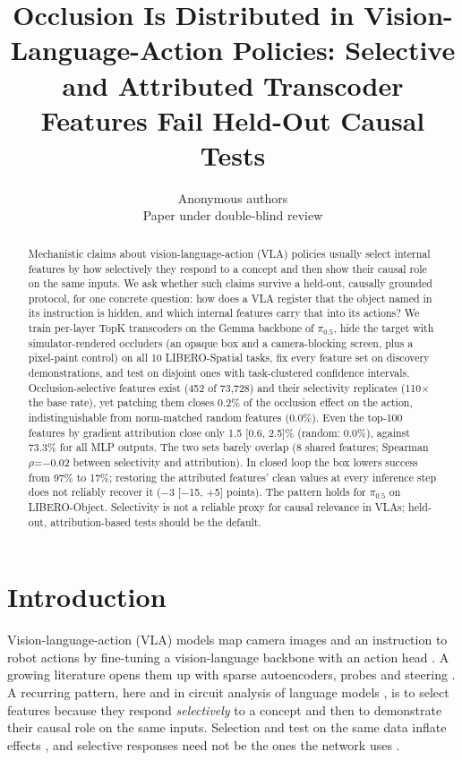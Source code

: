 \documentclass{article}
\title{Occlusion Is Distributed in Vision-Language-Action Policies: Selective and Attributed Transcoder Features Fail Held-Out Causal Tests}
\author{Anonymous authors\\Paper under double-blind review}
\begin{document}
\maketitle

\begin{abstract}
Mechanistic claims about vision-language-action (VLA) policies usually select internal features by how selectively they respond to a concept and then show their causal role on the same inputs. We ask whether such claims survive a held-out, causally grounded protocol, for one concrete question: how does a VLA register that the object named in its instruction is hidden, and which internal features carry that into its actions? We train per-layer TopK transcoders on the Gemma backbone of $\pi_{0.5}$, hide the target with simulator-rendered occluders (an opaque box and a camera-blocking screen, plus a pixel-paint control) on all 10 LIBERO-Spatial tasks, fix every feature set on discovery demonstrations, and test on disjoint ones with task-clustered confidence intervals. Occlusion-selective features exist (452 of 73,728) and their selectivity replicates (110$\times$ the base rate), yet patching them closes 0.2\% of the occlusion effect on the action, indistinguishable from norm-matched random features (0.0\%). Even the top-100 features by gradient attribution close only 1.5 [0.6, 2.5]\% (random: 0.0\%), against 73.3\% for all MLP outputs. The two sets barely overlap (8 shared features; Spearman $\rho$=$-$0.02 between selectivity and attribution). In closed loop the box lowers success from 97\% to 17\%; restoring the attributed features' clean values at every inference step does not reliably recover it ($-$3 [$-$15, +5] points). The pattern holds for $\pi_{0.5}$ on LIBERO-Object. Selectivity is not a reliable proxy for causal relevance in VLAs; held-out, attribution-based tests should be the default.
\end{abstract}

\section{Introduction}
\label{sec:intro}
Vision-language-action (VLA) models map camera images and an instruction to robot actions by fine-tuning a vision-language backbone
with an action head \citep{brohan2023rt2,kim2024openvla,black2024pi0,pi2025pi05}. A growing literature opens them up with sparse
autoencoders, probes and steering \citep{haon2025mechanistic,buurmeijer2026observing,swann2026sparse,grant2026features,jin2026event,shi2026vlatrace}.
A recurring pattern, here and in circuit analysis of language models \citep{marks2025sparse,ameisen2025circuit}, is to select features
because they respond \emph{selectively} to a concept and then to demonstrate their causal role on the same inputs. Selection and test on
the same data inflate effects \citep{kriegeskorte2009circular}, and selective responses need not be the ones the network uses
\citep{bolukbasi2021illusion,makelov2024subspace}.
\end{document}
